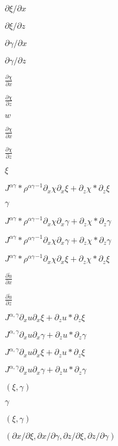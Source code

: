 \documentclass{article}
\begin{document}
$\partial \xi / \partial x$
\pagebreak

$\partial \xi / \partial z$
\pagebreak

$\partial \gamma / \partial x$
\pagebreak

$\partial \gamma / \partial z$
\pagebreak

$ \frac{\partial \chi}{\partial x} $
\pagebreak

$ \frac{\partial \chi}{\partial z} $
\pagebreak

$ w $
\pagebreak

$ \frac{\partial
\chi}{\partial x} $
\pagebreak

$ \frac{\partial
\chi}{\partial z} $
\pagebreak

$ \xi $
\pagebreak

$ J^{\alpha\gamma} * {\rho^{\alpha\gamma}}^{-1}
\partial_x \chi \partial_x \xi
+ \partial_z \chi * \partial_z \xi $
\pagebreak

$\gamma$
\pagebreak

$ J^{\alpha\gamma} * {\rho^{\alpha\gamma}}^{-1}
\partial_x \chi \partial_x \gamma
+ \partial_z \chi * \partial_z \gamma $
\pagebreak

$ J^{\alpha\gamma} * {\rho^{\alpha\gamma}}^{-1}
\partial_x \chi \partial_x \gamma + \partial_z \chi * \partial_z \gamma $
\pagebreak

$ J^{\alpha\gamma} * {\rho^{\alpha\gamma}}^{-1}
\partial_x \chi \partial_x \xi + \partial_z \chi * \partial_z \xi $
\pagebreak

$ \frac{\partial
\tilde{u}}{\partial x} $
\pagebreak

$ \frac{\partial
\tilde{u}}{\partial z} $
\pagebreak

$
J^{\alpha, \gamma} \partial_x u \partial_x \xi + \partial_z u * \partial_z
\xi $
\pagebreak

$
J^{\alpha, \gamma} \partial_x u \partial_x \gamma + \partial_z u *
\partial_z \gamma $
\pagebreak

$ J^{\alpha,
\gamma} \partial_x u \partial_x \xi + \partial_z u * \partial_z \xi $
\pagebreak

$ J^{\alpha,
\gamma} \partial_x u \partial_x \gamma + \partial_z u * \partial_z \gamma
$
\pagebreak

$(\xi, \gamma)$
\pagebreak

$ \gamma $
\pagebreak

$ (\xi, \gamma) $
\pagebreak

$ (\partial x/\partial \xi, \partial x/\partial \gamma,
\partial z/\partial \xi, \partial z/\partial \gamma) $
\pagebreak
\end{document}
